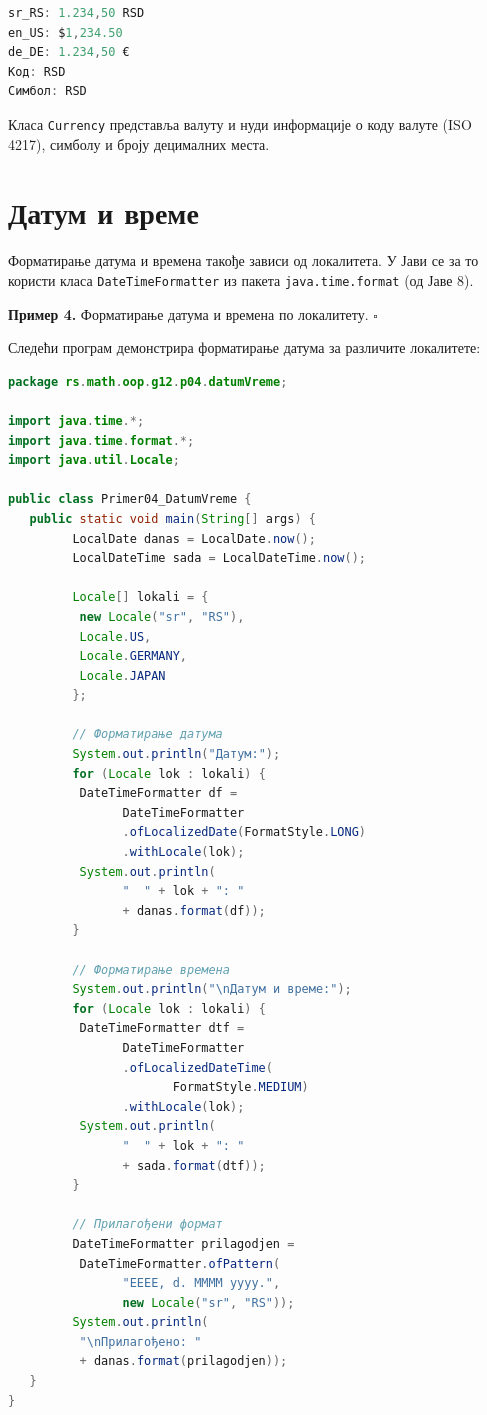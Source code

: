 \begin{lstlisting}[language=Java]
sr_RS: 1.234,50 RSD
en_US: $1,234.50
de_DE: 1.234,50 €
Код: RSD
Симбол: RSD
\end{lstlisting}


Класа \texttt{Currency} представља валуту и нуди информације о коду валуте (ISO 4217), симболу и броју децималних места.


\section{Датум и време}

Форматирање датума и времена такође зависи од локалитета. У Јави се за то користи класа \texttt{DateTimeFormatter} из пакета \texttt{java.time.format} (од Јаве 8).


\bigskip

\noindent \textbf{Пример 4.} Форматирање датума и времена по локалитету. $\square$

\medskip

Следећи програм демонстрира форматирање датума за различите локалитете:


\begin{lstlisting}[language=Java]
package rs.math.oop.g12.p04.datumVreme;
 
import java.time.*;
import java.time.format.*;
import java.util.Locale;
 
public class Primer04_DatumVreme {
   public static void main(String[] args) {
         LocalDate danas = LocalDate.now();
         LocalDateTime sada = LocalDateTime.now();
 
         Locale[] lokali = {
          new Locale("sr", "RS"),
          Locale.US,
          Locale.GERMANY,
          Locale.JAPAN
         };
 
         // Форматирање датума
         System.out.println("Датум:");
         for (Locale lok : lokali) {
          DateTimeFormatter df =
                DateTimeFormatter
                .ofLocalizedDate(FormatStyle.LONG)
                .withLocale(lok);
          System.out.println(
                "  " + lok + ": "
                + danas.format(df));
         }
 
         // Форматирање времена
         System.out.println("\nДатум и време:");
         for (Locale lok : lokali) {
          DateTimeFormatter dtf =
                DateTimeFormatter
                .ofLocalizedDateTime(
                       FormatStyle.MEDIUM)
                .withLocale(lok);
          System.out.println(
                "  " + lok + ": "
                + sada.format(dtf));
         }
 
         // Прилагођени формат
         DateTimeFormatter prilagodjen =
          DateTimeFormatter.ofPattern(
                "EEEE, d. MMMM yyyy.",
                new Locale("sr", "RS"));
         System.out.println(
          "\nПрилагођено: "
          + danas.format(prilagodjen));
   }
}
\end{lstlisting}



